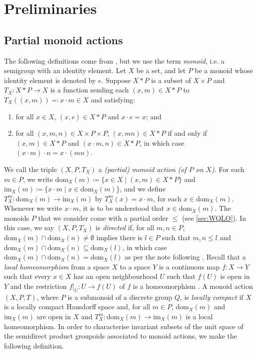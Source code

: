 \documentclass[11pt]{amsart}
\makeatletter
\theoremstyle{definition}
\numberwithin{thm}{section}
\numberwithin{equation}{section}
\def\namedlabel#1#2{\begingroup
    #2%
    \def\@currentlabel{#2}%
    \phantomsection\label{#1}\endgroup
}
\newcommand{\Define}[1]{\emph{#1}}
\newcommand{\setof}[2]{\{ #1 \mid #2 \}}
\newcommand{\RPA}[2]{#1 \cdot #2}
\newcommand{\RPAdom}[2]{\textrm{dom}_{#1}(#2)}
\newcommand{\RPAcod}[2]{\textrm{im}_{#1}(#2)}
\newcommand{\RPAmap}[2]{{T_{#1}^{#2}}}
\makeatother
\begin{document}
\section{Preliminaries}
\label{sec:prelims}

\subsection{Partial monoid actions}

The following definitions come from \cite[\S 5]{RW17}, but we use the term \Define{monoid}, i.e. a semigroup with an identity element.
Let $X$ be a set, and let $P$ be a monoid whose identity element is denoted by $e$.
Suppose $X * P$ is a subset of $X \times P$ and $T_X \colon X * P \to X$ is a function sending each $(x,m) \in X * P$ to $T_X((x, m)) \eqqcolon \RPA{x}{m} \in X$ and satisfying:
\begin{enumerate}
\item[\namedlabel{S1}{(S1)}] for all $x \in X$, $(x,e) \in X * P$ and $\RPA{x}{e} = x$; and
\item[\namedlabel{S2}{(S2)}] for all $(x,m,n) \in X \times P \times P$, $(x,mn) \in X * P$ if and only if $(x,m) \in X * P$ and $(\RPA{x}{m},n) \in X * P$, in which case $\RPA{(\RPA{x}{m})}{n} = \RPA{x}{(mn)}$.
\end{enumerate}
We call the triple $(X, P, T_X)$ a \Define{(partial) monoid action (of $P$ on $X$)}.
For each $m \in P$, we write $\RPAdom{X}{m} \coloneqq \setof{x \in X}{(x, m) \in X * P}$ and $\RPAcod{X}{m} \coloneqq \setof{\RPA{x}{m}}{x \in \RPAdom{X}{m}}$, and we define $\RPAmap{X}{m} \colon \RPAdom{X}{m} \to \RPAcod{X}{m}$ by $\RPAmap{X}{m}(x) = \RPA{x}{m}$, for each $x \in \RPAdom{X}{m}$. 
Whenever we write $\RPA{x}{m}$, it is to be understood that $x \in \RPAdom{X}{m}$.
The monoids $P$ that we consider come with a partial order $\leq$ (see \cref{sec:WQLO}). 
In this case, we say $(X, P, T_X)$ is \Define{directed} if, for all $m,n \in P$, $\RPAdom{X}{m} \cap \RPAdom{X}{n} \neq \emptyset$ implies there is $l \in P$ such that $m,n \leq l$ and $\RPAdom{X}{m} \cap \RPAdom{X}{n} \subseteq \RPAdom{X}{l}$, in which case $\RPAdom{X}{m} \cap \RPAdom{X}{n} = \RPAdom{X}{l}$ as per the note following \cite[Definition 5.2]{RW17}.
Recall that a \Define{local homeomorphism} from a space $X$ to a space $Y$ is a continuous map $f \colon X \to Y$ such that every $x \in X$ has an open neighbourhood $U$ such that $f(U)$ is open in $Y$ and the restriction $f|_U \colon U \to f(U)$ of $f$ is a homeomorphism \cite[Page 68]{Wil70}.
A monoid action $(X, P, T)$, where $P$ is a submonoid of a discrete group $Q$, is \Define{locally compact} if $X$ is a locally compact Hausdorff space and, for all $m \in P$, $\RPAdom{X}{m}$ and $\RPAcod{X}{m}$ are open in $X$ and $\RPAmap{X}{m} \colon \RPAdom{X}{m} \to \RPAcod{X}{m}$ is a local homeomorphism.
In order to characterise invariant subsets of the unit space of the semidirect product groupoids associated to monoid actions, we make the following definition.
\end{document}
